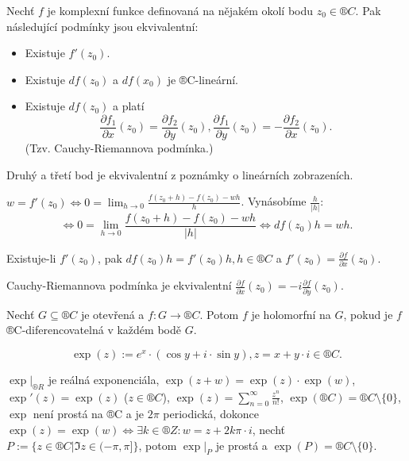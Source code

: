 \documentclass[12pt]{article}					%
\begin{document}
\begin{veta}
	Nechť $f$ je komplexní funkce definovaná na nějakém okolí bodu $z_0 \in ®C$. Pak následující podmínky jsou ekvivalentní:
	
	\begin{itemize}
		\item Existuje $f'(z_0)$.
		\item Existuje $d f(z_0)$ a $d f(x_0)$ je ®C-lineární.
		\item Existuje $d f(z_0)$ a platí
			$$ \frac{\partial f_1}{\partial x}(z_0) = \frac{\partial f_2}{\partial y}(z_0), \frac{\partial f_1}{\partial y}(z_0) = - \frac{\partial f_2}{\partial x}(z_0). $$
			(Tzv. Cauchy-Riemannova podmínka.)
	\end{itemize}

	\begin{dukazin}
		Druhý a třetí bod je ekvivalentní z poznámky o lineárních zobrazeních.

		$w = f'(z_0) \Leftrightarrow 0 = \lim_{h \rightarrow 0} \frac{f(z_0 + h) - f(z_0) - w h}{h}$. Vynásobíme $\frac{h}{|h|}$:
		$$ \Leftrightarrow 0 = \lim_{h \rightarrow 0} \frac{f(z_0 + h) - f(z_0) - wh}{|h|} \Leftrightarrow df(z_0) h = wh. $$
	\end{dukazin}
\end{veta}

\begin{poznamka}
	Existuje-li $f'(z_0)$, pak $df(z_0)h = f'(z_0)h, h \in ®C$ a $f'(z_0) = \frac{\partial f}{\partial x}(z_0)$.

	Cauchy-Riemannova podmínka je ekvivalentní $\frac{\partial f}{\partial x}(z_0) = -i \frac{\partial f}{\partial y}(z_0)$.
\end{poznamka}


\begin{definice}
	Nechť $G \subseteq ®C$ je otevřená a $f: G \rightarrow ®C$. Potom $f$ je holomorfní na $G$, pokud je $f$ ®C-diferencovatelná v každém bodě $G$.
\end{definice}

\begin{definice}[Exponenciála]
	$$ \exp(z) := e^x·(\cos y + i·\sin y), z = x + y·i \in ®C. $$
\end{definice}

\begin{tvrzeni}
	$\exp|_{®R}$ je reálná exponenciála, $\exp(z + w) = \exp(z)·\exp(w)$, $\exp'(z) = \exp(z)$ ($z \in ®C$), $\exp(z) = \sum_{n=0}^∞ \frac{z^n}{n!}$, $\exp(®C) = ®C \setminus \{ 0 \}$, $\exp$ není prostá na ®C a je $2\pi$ periodická, dokonce $\exp(z) = \exp(w) \Leftrightarrow \exists k \in ®Z: w = z + 2k\pi·i$, nechť $P := \{z \in ®C | \Im z \in (-\pi, \pi]\}$, potom $\exp|_P$ je prostá a $\exp(P) = ®C \setminus \{0\}$.
\end{tvrzeni}
\end{document}
